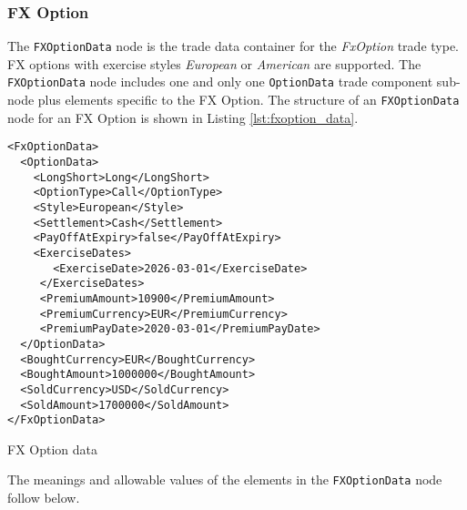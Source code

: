 \subsubsection{FX Option}

The \lstinline!FXOptionData! node is the trade data container for the \emph{FxOption} trade type. FX options with exercise styles \emph{European} or \emph{American} are supported. 
The \lstinline!FXOptionData! node includes one and only one \lstinline!OptionData! trade
component sub-node plus elements specific to the FX Option. The structure of an \lstinline!FXOptionData! node
for an FX Option is shown in Listing \ref{lst:fxoption_data}.

\begin{listing}[H]
\begin{verbatim}
<FxOptionData>
  <OptionData>
    <LongShort>Long</LongShort>
    <OptionType>Call</OptionType>
    <Style>European</Style>
    <Settlement>Cash</Settlement>
    <PayOffAtExpiry>false</PayOffAtExpiry>
    <ExerciseDates>
       <ExerciseDate>2026-03-01</ExerciseDate>
     </ExerciseDates>
     <PremiumAmount>10900</PremiumAmount>
     <PremiumCurrency>EUR</PremiumCurrency>
     <PremiumPayDate>2020-03-01</PremiumPayDate>
  </OptionData>
  <BoughtCurrency>EUR</BoughtCurrency>
  <BoughtAmount>1000000</BoughtAmount>
  <SoldCurrency>USD</SoldCurrency>
  <SoldAmount>1700000</SoldAmount>
</FxOptionData>
\end{verbatim}
\caption{FX Option data}
\label{lst:fxoption_data}
\end{listing}

The meanings and allowable values of the elements in the \lstinline!FXOptionData! node follow below.

